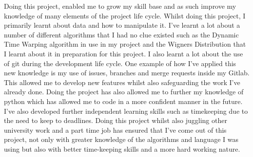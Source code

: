 \documentclass[10pt,a4paper]{report}
\begin{document}
Doing this project, enabled me to grow my skill base and as such improve my knowledge of many elements of the project life cycle. Whilst doing this project, I primarily learnt about data and how to manipulate it. I've learnt a lot about a number of different algorithms that I had no clue existed such as the Dynamic Time Warping algorithm in use in my project and the Wigners Distribution that I learnt about it in preparation for this project. I also learnt a lot about the use of git during the development life cycle. One example of how I've applied this new knowledge is my use of issues, branches and merge requests inside my Gitlab. This allowed me to develop new features whilst also safeguarding the work I've already done. Doing the project has also allowed me to further my knowledge of python which has allowed me to code in a more confident manner in the future. I've also developed further independent learning skills such as timekeeping due to the need to keep to deadlines. Doing this project whilst also juggling other university work and a part time job has ensured that I've come out of this project, not only with greater knowledge of   the algorithms and language I was using but also with better time-keeping skills and a more hard working nature.
\end{document}
